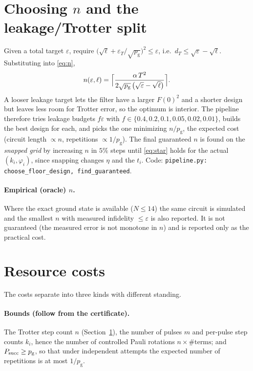 \documentclass[11pt]{article}
\theoremstyle{definition}
\newcommand{\eps}{\varepsilon}
\newcommand{\pg}{p_{\mathrm g}}
\newcommand{\code}[1]{\texttt{#1}}
\begin{document}
\section{Choosing $n$ and the leakage/Trotter split}\label{sec:choose}
Given a total target $\eps$, require $\bigl(\sqrt\ell+\eps_T/\sqrt{\pg}\bigr)^2\le\eps$, i.e.\ $d_T\le\sqrt\eps-\sqrt\ell$.
Substituting into \eqref{eq:n},
\begin{equation}
  n(\eps,\ell)=\Bigl\lceil\frac{\alpha\,T^2}{2\sqrt{\pg}\,\bigl(\sqrt\eps-\sqrt\ell\bigr)}\Bigr\rceil .
\end{equation}
A looser leakage target lets the filter have a larger $F(0)^2$ and a shorter design but leaves less room for Trotter error, so
the optimum is interior. The pipeline therefore tries leakage budgets $f\eps$ with $f\in\{0.4,0.2,0.1,0.05,0.02,0.01\}$, builds
the best design for each, and picks the one minimizing $n/\pg$, the expected cost (circuit length $\propto n$, repetitions
$\propto1/\pg$). The final guaranteed $n$ is found on the \emph{snapped grid} by increasing $n$ in $5\%$ steps until
\eqref{eq:star} holds for the actual $(k_i,\varphi_i)$, since snapping changes $\eta$ and the $t_i$. Code:
\code{pipeline.py: choose\_floor\_design, find\_guaranteed}.

\paragraph{Empirical (oracle) $n$.} Where the exact ground state is available ($N\le14$) the same circuit is simulated and the
smallest $n$ with measured infidelity $\le\eps$ is also reported. It is not guaranteed (the measured error is not monotone in
$n$) and is reported only as the practical cost.

\section{Resource costs}\label{sec:cost}
The costs separate into three kinds with different standing.

\paragraph{Bounds (follow from the certificate).} The Trotter step count $n$ (Section~\ref{sec:choose}), the number of pulses $m$ and per-pulse step
counts $k_i$, hence the number of controlled Pauli rotations $n\times\#\text{terms}$; and $P_{\rm succ}\ge\pg$, so that under independent attempts
the expected number of repetitions is at most $1/\pg$.
\end{document}
